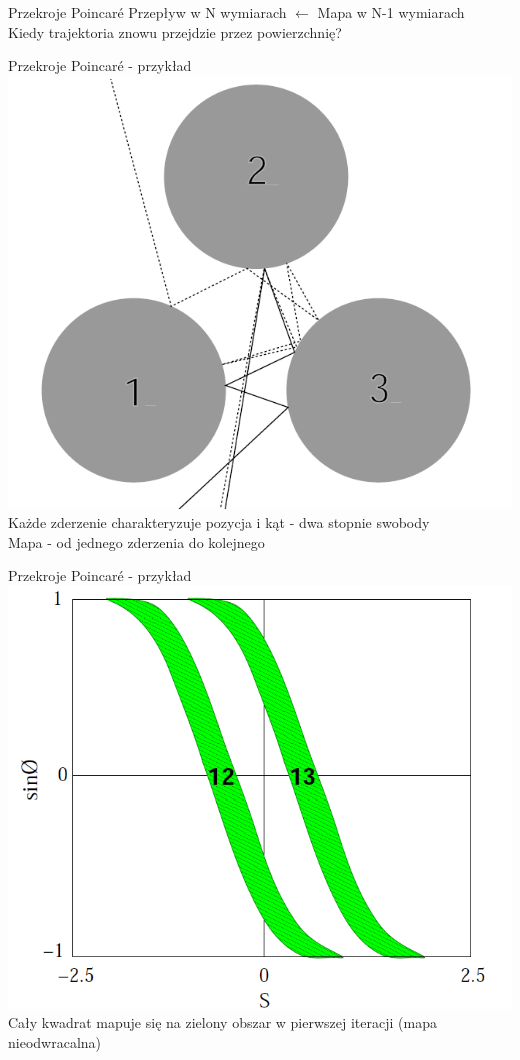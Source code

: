 \documentclass{beamer}
\begin{document}
\begin{frame}{Przekroje Poincaré} \pause
Przepływ w N wymiarach $\leftarrow$ Mapa w N-1 wymiarach\\ \pause
Kiedy trajektoria znowu przejdzie przez powierzchnię?\\ \pause
\end{frame}

\begin{frame}{Przekroje Poincaré - przykład}
\centering
\includegraphics[height=0.7\textheight]{pinball}\\
Każde zderzenie charakteryzuje pozycja i kąt - dwa stopnie swobody\\
Mapa - od jednego zderzenia do kolejnego
\end{frame}

\begin{frame}{Przekroje Poincaré - przykład}
\centering
\includegraphics[height=0.7\textheight]{poincare_section}\\
Cały kwadrat mapuje się na zielony obszar w pierwszej iteracji (mapa nieodwracalna)
\end{frame}
\end{document}
